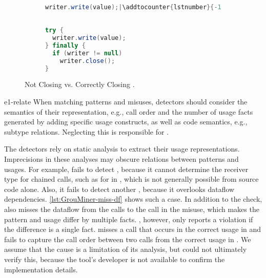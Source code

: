 \begin{figure}[tb]
  \begin{subfigure}[t]{0.46\columnwidth}
    \begin{lstlisting}[language=java,numberblanklines=false,escapeinside=||,firstnumber=0]

writer.write(value);|\addtocounter{lstnumber}{-1}|



\end{lstlisting}
  \end{subfigure}
  \begin{subfigure}[t]{0.46\columnwidth}
    \begin{lstlisting}[language=java]
try {
  writer.write(value);
} finally {
  if (writer != null)
    writer.close();
}
    \end{lstlisting}
  \end{subfigure}
  \caption{Not Closing  vs. Correctly Closing .}
  \label{lst:tikanga-distance}
\end{figure}

\begin{obs}{e1-relate}
  When matching patterns and misuses, detectors should consider the semantics of their representation, e.g., call order and the number of usage facts generated by adding specific usage constructs, as well as code semantics, e.g., subtype relations.
  Neglecting this is responsible for .
\end{obs}

\vspace{0.03in}
The detectors rely on static analysis to extract their usage representations.
Imprecisions in these analyses may obscure relations between patterns and usages.
For example, \GROUMiner fails to detect , because it cannot determine the receiver type for chained calls, such as for  in , which is not generally possible from source code alone.
%
Also, it fails to detect another , because it overlooks dataflow dependencies.
\autoref{lst:GrouMiner-miss-df} shows such a case.
In addition to the  check, \GROUMiner also misses the dataflow from the  calls to the  call in the misuse, which makes the pattern and usage differ by multiple facts.
\GROUMiner, however, only reports a violation if the difference is a single fact.
%
\Tikanga misses a call that occurs in the correct usage in  and fails to capture the call order between two calls from the correct usage in .
We assume that the cause is a limitation of its analysis, but could not ultimately verify this, because the tool's developer is not available to confirm the implementation details.

